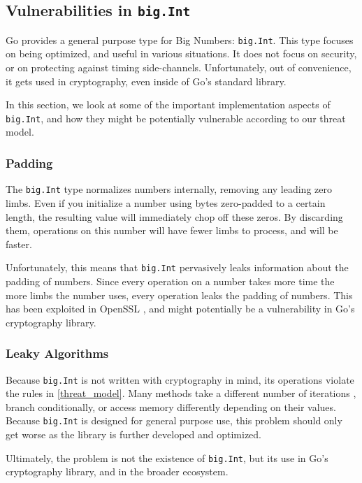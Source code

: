 \documentclass[11pt, a4paper]{article} %
\begin{document}
{\subsection{Vulnerabilities in \texttt{big.Int}}

Go provides a general purpose type for Big Numbers: \texttt{big.Int}.
This type focuses on being optimized, and useful in various
situations. It does not focus on security, or on protecting
against timing side-channels.
Unfortunately, out of convenience, it gets used in
cryptography, even inside of Go's standard library.

In this section, we look at some of the important implementation aspects
of \texttt{big.Int}, and how they might be potentially vulnerable
according to our threat model.

\subsubsection{Padding}

The \texttt{big.Int} type normalizes numbers internally,
removing any leading zero limbs. Even if you initialize a number
using bytes zero-padded to a certain length, the resulting value
will immediately chop off these zeros.
By discarding them, operations on
this number will have fewer limbs to process, and will be faster.

Unfortunately, this means that \texttt{big.Int} pervasively leaks information
about the padding of numbers. Since every operation on
a number takes more time the more limbs the number uses,
every operation leaks the padding of numbers.
This has been exploited
in OpenSSL \cite{merget_raccoon_2019}, and might potentially
be a vulnerability in Go's cryptography library.

\subsubsection{Leaky Algorithms}

Because \texttt{big.Int} is not written with cryptography in mind,
its operations violate the rules in
\ref{threat_model}. Many methods take a different number of iterations
, branch conditionally, or
access memory differently
depending on their values. Because \texttt{big.Int}
is designed for general purpose use, this problem should only get worse
as the library is further developed and optimized.

Ultimately, the problem is not the existence of \texttt{big.Int},
but its use in Go's cryptography library, and in the broader ecosystem.

}
\end{document}
